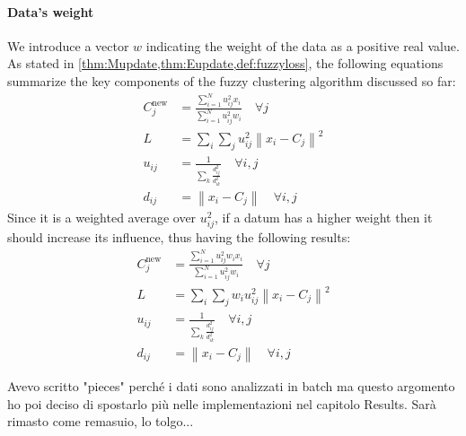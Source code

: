 \paragraph{Data's weight}
We introduce a vector $w$ indicating the weight of the data as a positive real value. As stated in \cref{thm:Mupdate,thm:Eupdate,def:fuzzyloss}, the following equations summarize the key components of the fuzzy clustering algorithm discussed so far:
\begin{align*}
	C_{j}^\text{new} &= \frac{\sum_{i=1}^N u_{ij}^2x_i}{\sum_{i=1}^N u_{ij}^2w_i} \quad \forall j\\
	L &= \sum_i\sum_j u_{ij}^2\left\|x_i-C_j\right\|^2 \\
	u_{ij} &= \frac{1}{\sum_k\frac{d_{ij}^2}{d_{ik}^2}} \quad \forall i,j\\
	d_{ij} &= \left\|x_i - C_{j}\right\| \quad \forall i,j
\end{align*}
Since it is a weighted average over $u_{ij}^2$, if a datum has a higher weight then it should increase its influence, thus having the following results:
\begin{align*}
	C_{j}^\text{new} &= \frac{\sum_{i=1}^N u_{ij}^2w_ix_i}{\sum_{i=1}^N u_{ij}^2w_i} \quad \forall j\\
	L &= \sum_i\sum_j w_{i}u_{ij}^2\left\|x_i-C_j\right\|^2 \\
	u_{ij} &= \frac{1}{\sum_k\frac{d_{ij}^2}{d_{ik}^2}} \quad \forall i,j\\
	d_{ij} &= \left\|x_i - C_{j}\right\| \quad \forall i,j
\end{align*}

\begin{note}
	Avevo scritto "pieces" perché i dati sono analizzati in batch ma questo argomento ho poi deciso di spostarlo più nelle implementazioni nel capitolo Results. Sarà rimasto come remasuio, lo tolgo...
\end{note}
